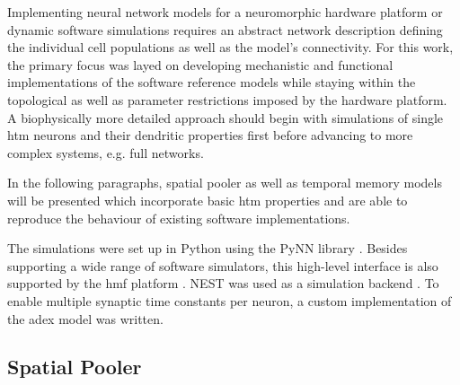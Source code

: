 Implementing neural network models for a neuromorphic hardware platform or dynamic software simulations requires an abstract network description defining the individual cell populations as well as the model's connectivity. For this work, the primary focus was layed on developing mechanistic and functional implementations of the software reference models while staying within the topological as well as parameter restrictions imposed by the hardware platform. A biophysically more detailed approach should begin with simulations of single \gls{htm} neurons and their dendritic properties first before advancing to more complex systems, e.g. full networks.

In the following paragraphs, spatial pooler as well as temporal memory models will be presented which incorporate basic \gls{htm} properties and are able to reproduce the behaviour of existing software implementations.

The simulations were set up in Python using the PyNN library \citep{davison2008pynn}. Besides supporting a wide range of software simulators, this high-level interface is also supported by the \gls{hmf} platform \citep{billaudelle14pyhmf}. NEST was used as a simulation backend \citep{gewaltig2007nest}. To enable multiple synaptic time constants per neuron, a custom implementation of the \gls{adex} model was written.

\subsection{Spatial Pooler}
\label{sss:spatial_pooler_network}

